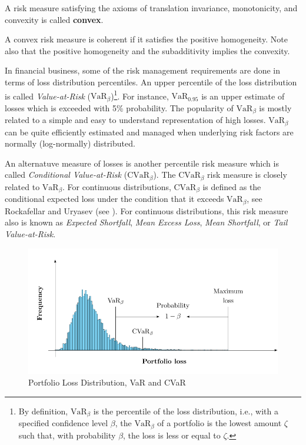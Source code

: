 \begin{definition}
	A risk measure satisfying the axioms of translation invariance, monotonicity, and convexity is called \textbf{convex}.
\end{definition}

\begin{proposition}
	A convex risk measure is coherent if it satisfies the positive homogeneity. Note also that the positive homogeneity and the subadditivity implies the convexity.
\end{proposition}


In financial business, some of the risk management requirements are done in terms of loss distribution percentiles. An upper percentile of the loss distribution is called \textit{Value-at-Risk} ($\mbox{VaR}_\beta$)\footnote{By definition, $\mbox{VaR}_\beta$ is the percentile of the loss distribution, i.e., with a specified confidence level $\beta$, the $\mbox{VaR}_\beta$ of a portfolio is the lowest amount $\zeta$ such that, with probability $\beta$, the loss is less or equal to $\zeta$.}. For instance, $\mbox{VaR}_{0.95}$ is an upper estimate of losses which is exceeded with 5\% probability. The popularity of $\mbox{VaR}_\beta$ is mostly related to a simple and easy to understand representation of high losses. $\mbox{VaR}_\beta$ can be quite efficiently estimated and managed when underlying risk factors are normally (log-normally) distributed.

An alternatuve measure of losses is another percentile risk measure which is called \textit{Conditional Value-at-Risk} ($\mbox{CVaR}_\beta$). The $\mbox{CVaR}_\beta$ risk measure is closely related to $\mbox{VaR}_\beta$. For continuous distributions, $\mbox{CVaR}_\beta$ is defined as the conditional expected loss under the condition that it exceeds $\mbox{VaR}_\beta$, see Rockafellar and Uryasev (see \cite{RockafellarUryasev2001}). For continuous distributions, this risk measure also is known as \emph{Expected Shortfall}, \textit{Mean Excess Loss}, \textit{Mean Shortfall}, or \textit{Tail Value-at-Risk}.


\begin{figure}[H]
	\centering
	\includegraphics{figures/VarCvar.pdf}
	\caption{Portfolio Loss Distribution, VaR and CVaR}
	\label{fig:VarCvar}
\end{figure}

